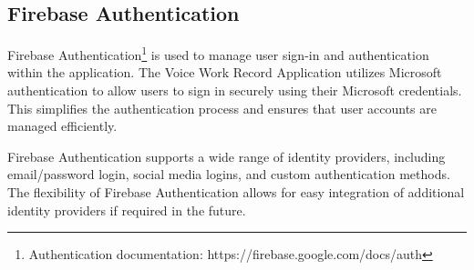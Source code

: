 \documentclass[
  digital,     %
  oneside,     %
  nosansbold,  %
  nocolorbold, %
  lof,         %
  lot,         %
]{fithesis4}
\begin{document}
\subsection{Firebase Authentication}

Firebase Authentication\footnote{Authentication documentation: https://firebase.google.com/docs/auth} is used to manage user sign-in and authentication within the application. The Voice Work Record Application utilizes Microsoft authentication to allow users to sign in securely using their Microsoft credentials. This simplifies the authentication process and ensures that user accounts are managed efficiently.

Firebase Authentication supports a wide range of identity providers, including email/password login, social media logins, and custom authentication methods. The flexibility of Firebase Authentication allows for easy integration of additional identity providers if required in the future.

\shorthandoff{-}
\begin{markdown}
\end{markdown}
\shorthandon{-}
\end{document}
